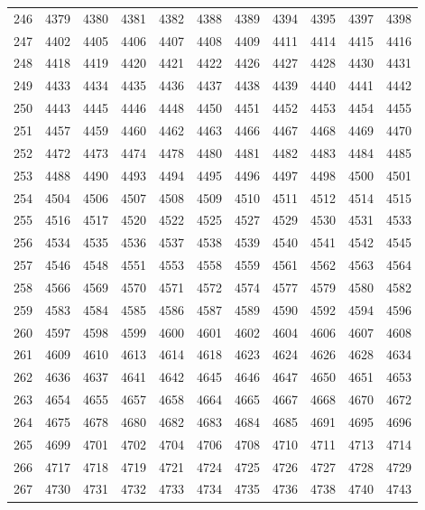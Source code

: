 \begin{longtable}{|r|rrrrrrrrrr|}
  246 & 4379 & 4380 & 4381 & 4382 & 4388 & 4389 & 4394 & 4395 & 4397 & 4398 \\ 
  247 & 4402 & 4405 & 4406 & 4407 & 4408 & 4409 & 4411 & 4414 & 4415 & 4416 \\ 
  248 & 4418 & 4419 & 4420 & 4421 & 4422 & 4426 & 4427 & 4428 & 4430 & 4431 \\ 
  249 & 4433 & 4434 & 4435 & 4436 & 4437 & 4438 & 4439 & 4440 & 4441 & 4442 \\ 
  250 & 4443 & 4445 & 4446 & 4448 & 4450 & 4451 & 4452 & 4453 & 4454 & 4455 \\ 
  251 & 4457 & 4459 & 4460 & 4462 & 4463 & 4466 & 4467 & 4468 & 4469 & 4470 \\ 
  252 & 4472 & 4473 & 4474 & 4478 & 4480 & 4481 & 4482 & 4483 & 4484 & 4485 \\ 
  253 & 4488 & 4490 & 4493 & 4494 & 4495 & 4496 & 4497 & 4498 & 4500 & 4501 \\ 
  254 & 4504 & 4506 & 4507 & 4508 & 4509 & 4510 & 4511 & 4512 & 4514 & 4515 \\ 
  255 & 4516 & 4517 & 4520 & 4522 & 4525 & 4527 & 4529 & 4530 & 4531 & 4533 \\ 
  256 & 4534 & 4535 & 4536 & 4537 & 4538 & 4539 & 4540 & 4541 & 4542 & 4545 \\ 
  257 & 4546 & 4548 & 4551 & 4553 & 4558 & 4559 & 4561 & 4562 & 4563 & 4564 \\ 
  258 & 4566 & 4569 & 4570 & 4571 & 4572 & 4574 & 4577 & 4579 & 4580 & 4582 \\ 
  259 & 4583 & 4584 & 4585 & 4586 & 4587 & 4589 & 4590 & 4592 & 4594 & 4596 \\ 
  260 & 4597 & 4598 & 4599 & 4600 & 4601 & 4602 & 4604 & 4606 & 4607 & 4608 \\ 
  261 & 4609 & 4610 & 4613 & 4614 & 4618 & 4623 & 4624 & 4626 & 4628 & 4634 \\ 
  262 & 4636 & 4637 & 4641 & 4642 & 4645 & 4646 & 4647 & 4650 & 4651 & 4653 \\ 
  263 & 4654 & 4655 & 4657 & 4658 & 4664 & 4665 & 4667 & 4668 & 4670 & 4672 \\ 
  264 & 4675 & 4678 & 4680 & 4682 & 4683 & 4684 & 4685 & 4691 & 4695 & 4696 \\ 
  265 & 4699 & 4701 & 4702 & 4704 & 4706 & 4708 & 4710 & 4711 & 4713 & 4714 \\ 
  266 & 4717 & 4718 & 4719 & 4721 & 4724 & 4725 & 4726 & 4727 & 4728 & 4729 \\ 
  267 & 4730 & 4731 & 4732 & 4733 & 4734 & 4735 & 4736 & 4738 & 4740 & 4743 \\ 

\end{longtable}

